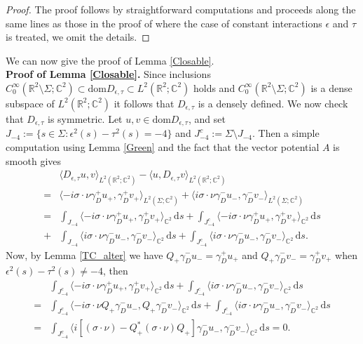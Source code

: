 \documentclass[11pt,a4paper,reqno,oneside]{amsproc}
\DeclareMathOperator{\dom}{dom}
\def \rr {{\mathbb R}}
\def \cc {{\mathbb C}}
\numberwithin{equation}{section}
\def\dom{\mathrm{dom}}
\def \cc {{\mathbb{C}}}
\begin{document}
\begin{proof} The proof follows by straightforward computations and proceeds along the same lines as those in the proof of \cite[Lemma 4.1]{BHOP20} where the case of constant interactions $\epsilon$ and $\tau$ is treated, we omit the details.
\end{proof}

We can now give the proof of Lemma \ref{Closable}.\\



\textbf{Proof of Lemma \ref{Closable}.} Since inclusions $C^\infty_0(\rr^2\setminus\Sigma;\cc^2)\subset \dom D_{\epsilon,\tau}\subset L^2(\rr^2;\cc^2)$ holds and $C^\infty_0(\rr^2\setminus\Sigma;\cc^2)$ is a dense subspace of $L^2(\rr^2;\cc^2)$ it follows that $D_{\epsilon,\tau}$ is a densely defined. We now check that $D_{\epsilon,\tau}$ is symmetric. Let  $u,v\in\dom D_{\epsilon,\tau}$, and set $J_{-4}:=\{s\in \Sigma: \epsilon^2(s)-\tau^2(s)=-4\}$ and $J^c_{-4}:=\Sigma\setminus J_{-4}$. %
Then a simple computation using Lemma \ref{Green} and the fact that the vector potential $A$ is smooth gives 
\begin{align*}
   & \langle D_{\epsilon,\tau} u, v\rangle_{L^2(\rr^2;\cc^2)}-\langle u, D_{\epsilon,\tau} v \rangle_{L^2(\rr^2;\cc^2)}
   \\=&\langle - i\sigma\cdot\nu\gamma_D^+ u_+, \gamma_D^+ v_+ \rangle_{L^2(\Sigma;\cc^2)}+ \langle  i\sigma\cdot\nu\gamma_D^- u_-, \gamma_D^- v_- \rangle_{L^2(\Sigma;\cc^2)}\\
    =& \int_{J_{-4}}  \langle - i\sigma\cdot\nu\gamma_D^+ u_+,{ \gamma_D^+ v_+}\rangle_{\mathbb C^2}\,\mathrm{d}s +\int_{J^c_{-4}} \langle-i\sigma\cdot\nu\gamma_D^+ u_+,{ \gamma_D^+ v_+}\rangle_{\mathbb C^2}\, \mathrm ds\\
    +&  \int_{J_{-4}} \langle i\sigma\cdot\nu\gamma_D^- u_-,{ \gamma_D^- v_-} \rangle_{\mathbb C^2}\,\mathrm ds + \int_{J^c_{-4}}  \langle i\sigma\cdot\nu\gamma_D^- u_-,{ \gamma_D^- v_-} \rangle_{\mathbb C^2}\,\mathrm{d}s.
\end{align*}
Now, by Lemma \ref{TC_alter}  we have $Q_+ \gamma_D^- u_-=  \gamma_D^+ u_+$ and $Q_+ \gamma_D^- v_-=  \gamma_D^+ v_+$  when $\epsilon^2(s)-\tau^2(s)\neq-4$, then 
    \begin{align*}
   &\int_{J^c_{-4}} \langle- i\sigma\cdot\nu\gamma_D^+ u_+,{ \gamma_D^+ v_+} \rangle_{\mathbb C^2}\,\mathrm{d}s+\int_{J^c_{-4}}  \langle i\sigma\cdot\nu\gamma_D^- u_-,{ \gamma_D^- v_-} \rangle_{\mathbb C^2}\,\mathrm{d}s\\
    =&  \int_{J^c_{-4}}  \langle- i\sigma\cdot\nu Q_+\gamma_D^- u_-, {Q_+\gamma_D^- v_-}  \rangle_{\mathbb C^2}\,\mathrm{d}s + \int_{J^c_{-4}}  \langle i\sigma\cdot\nu\gamma_D^- u_-, \gamma_D^- v_-\rangle_{\mathbb C^2}\,\mathrm{d}s \\
    =& \int_{J^c_{-4}} \langle i[ (\sigma\cdot\nu) - Q_+^\ast(\sigma\cdot\nu)Q_+]\gamma_D^- u_-, \gamma_D^- v_- \rangle_{\mathbb C^2}\,\mathrm{d}s=0.   
\end{align*}
\end{document}
